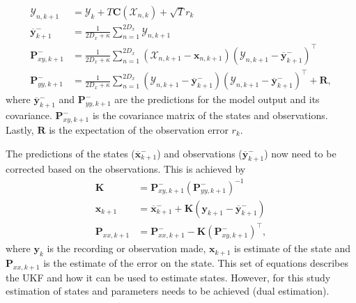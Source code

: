 \begin{align}
\mathbf{\mathcal{Y}}_{n,k+1} &= \mathbf{\mathcal{Y}}_{k} + T\mathbf{C}(\mathbf{\mathcal{X}}_{n,k})+ \sqrt{T}{r}_{k}\\
\overline{\mathbf{y}}_{k+1}^{-} &= \frac{1}{2D_{x}+\kappa}\sum_{n=1}^{2D_{x}} \mathbf{\mathcal{Y}}_{n,k+1}\\
\label{eqn: statecovg}
\mathbf{P}_{xy,k+1}^{-} &= \frac{1}{2D_{x}+\kappa}\sum_{n=1}^{2D_{x}} (\mathbf{\mathcal{X}}_{n,k+1}-\mathbf{x}_{n,k+1}) (\mathbf{\mathcal{Y}}_{n,k+1}-\overline{\mathbf{y}}_{k+1}^{-})^{\top}\\
\mathbf{P}_{yy,k+1}^{-} &= \frac{1}{2D_{x}+\kappa}\sum_{n=1}^{2D_{x}} (\mathbf{\mathcal{Y}}_{n,k+1}-\overline{\mathbf{y}}_{k+1}^{-}) (\mathbf{\mathcal{Y}}_{n,k+1}-\overline{\mathbf{y}}_{k+1}^{-})^{\top} +\mathbf{R},%
\end{align} where $\overline{\mathbf{y}}_{k+1}^{-}$ and $\mathbf{P}_{yy,k+1}^{-}$ are the predictions for the model output and its covariance. $\mathbf{P}_{xy,k+1}^{-}$ is the covariance matrix of the states and observations. Lastly, $\mathbf{R}$ is the expectation of the observation error $r_{k}$.

The predictions of the states ($\overline{\mathbf{x}}_{k+1}^{-}$) and observations ($\overline{\mathbf{y}}_{k+1}^{-}$) now need to be corrected based on the observations. This is achieved by \begin{align}
\mathbf{K} &= \mathbf{P}_{xy,k+1}^{-}(\mathbf{P}_{yy,k+1}^{-})^{-1}\\
\mathbf{x}_{k+1} &= \overline{\mathbf{x}}_{k+1}^{-} + \mathbf{K}(\mathbf{y}_{k+1}-\overline{\mathbf{y}}_{k+1}^{-})\\
\mathbf{P}_{xx,k+1} &= \mathbf{P}_{xx,k+1}^{-} - \mathbf{K}(\mathbf{P}_{xy,k+1}^{-})^{\top},
\end{align} where $\mathbf{y}_{k}$ is the recording or observation made, $\mathbf{x}_{k+1}$ is estimate of the state and $\mathbf{P}_{xx,k+1}$ is the estimate of the error on the state. This set of equations describes the UKF and how it can be used to estimate states. However, for this study estimation of states and parameters needs to be achieved (dual estimation).

